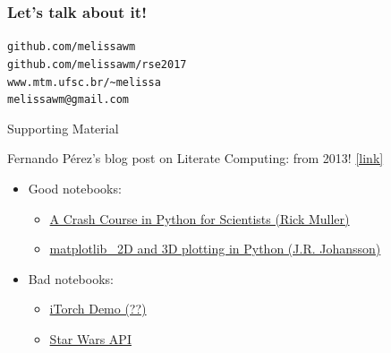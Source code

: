 \documentclass[10pt]{beamer}
\begin{document}
\begin{frame}[fragile]
   \frametitle{Let's talk about it!}
   \begin{center}
      \begin{minipage}{0.7\textwidth}
      \begin{block}{}
         \begin{center}
           \verb+github.com/melissawm+\\
           \verb+github.com/melissawm/rse2017+\\
            \verb+www.mtm.ufsc.br/~melissa+\\
            \verb+melissawm@gmail.com+
         \end{center}
      \end{block}
    \end{minipage}
    \vfill
  \end{center}

\end{frame}

\begin{frame}{Supporting Material}

  Fernando Pérez's blog post on Literate Computing: from 2013! \href{http://blog.fperez.org/2013/04/literate-computing-and-computational.html}{\alert{[link]}}
  
  \begin{itemize}
  \item Good notebooks:
    \begin{itemize}
    \item \href{http://nbviewer.jupyter.org/gist/rpmuller/5920182}{A Crash Course in Python for Scientists (Rick Muller)}
    \item \href{http://nbviewer.jupyter.org/github/jrjohansson/scientific-python-lectures/blob/master/Lecture-4-Matplotlib.ipynb}{matplotlib \textemdash\ 2D and 3D plotting in Python (J.R. Johansson)}
    \end{itemize}
  \item Bad notebooks:
    \begin{itemize}
    \item \href{http://nbviewer.jupyter.org/github/facebook/iTorch/blob/master/iTorch_Demo.ipynb}{iTorch Demo (??)}
    \item \href{http://nbviewer.jupyter.org/github/rasbt/pattern_classification/blob/master/data_viz/swapi_viz.ipynb}{Star Wars API}
    \end{itemize}
  \end{itemize}
\end{frame}
\end{document}
